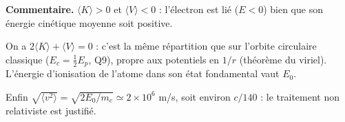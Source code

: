 \documentclass[11pt,a4paper]{article}
\newcommand{\equationajustee}[1]{%
  \sbox{\boiteequation}{$\displaystyle #1$}%
  \ifdim\wd\boiteequation>\linewidth
    \[\resizebox{\linewidth}{!}{\usebox{\boiteequation}}\]%
  \else
    \[#1\]%
  \fi}
\begin{document}
\equationajustee{\boxed{\langle K\rangle=E_0\simeq14\ \text{eV}}}

\textbf{Commentaire.} \(\langle K\rangle>0\) et \(\langle V\rangle<0\) : l'électron est lié (\(E<0\)) bien que son énergie cinétique moyenne soit positive.

On a \(2\langle K\rangle+\langle V\rangle=0\) : c'est la même répartition que sur l'orbite circulaire classique (\(E_c=\frac12E_p\), Q9), propre aux potentiels en \(1/r\) (théorème du viriel). L'énergie d'ionisation de l'atome dans son état fondamental vaut \(E_0\).

Enfin \(\sqrt{\langle v^2\rangle}=\sqrt{2E_0/m_e}\simeq2\times10^6\) m/s, soit environ \(c/140\) : le traitement non relativiste est justifié.
\end{document}
